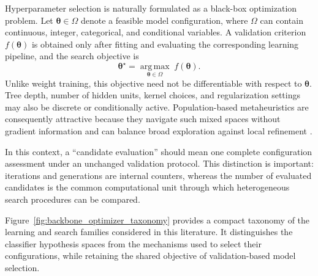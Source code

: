 Hyperparameter selection is naturally formulated as a black-box optimization problem. Let $\boldsymbol{\theta} \in \Omega$ denote a feasible model configuration, where $\Omega$ can contain continuous, integer, categorical, and conditional variables. A validation criterion $f(\boldsymbol{\theta})$ is obtained only after fitting and evaluating the corresponding learning pipeline, and the search objective is
\begin{equation}\label{eq:metaheuristic_objective}
\boldsymbol{\theta}^{\star} = \underset{\boldsymbol{\theta} \in \Omega}{\operatorname{arg\,max}}\; f(\boldsymbol{\theta}).
\end{equation}
Unlike weight training, this objective need not be differentiable with respect to $\boldsymbol{\theta}$. Tree depth, number of hidden units, kernel choices, and regularization settings may also be discrete or conditionally active. Population-based metaheuristics are consequently attractive because they navigate such mixed spaces without gradient information and can balance broad exploration against local refinement \cite{jovanovic2024wann, faris2018gwo_review, rajwar2023exhaustive_review}.

In this context, a “candidate evaluation” should mean one complete configuration assessment under an unchanged validation protocol. This distinction is important: iterations and generations are internal counters, whereas the number of evaluated candidates is the common computational unit through which heterogeneous search procedures can be compared.

Figure~\ref{fig:backbone_optimizer_taxonomy} provides a compact taxonomy of the learning and search families considered in this literature. It distinguishes the classifier hypothesis spaces from the mechanisms used to select their configurations, while retaining the shared objective of validation-based model selection.

